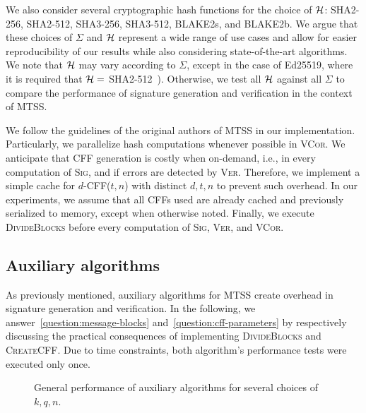 \documentclass[12pt]{article}
\begin{document}
We also consider several cryptographic hash functions for the choice of $\mathcal{H}$: SHA2-256, SHA2-512, SHA3-256, SHA3-512, BLAKE2s, and BLAKE2b. We argue that these choices of $\Sigma$ and $\mathcal{H}$ represent a wide range of use cases and allow for easier reproducibility of our results while also considering state-of-the-art algorithms. We note that $\mathcal{H}$ may vary according to $\Sigma$, except in the case of Ed25519, where it is required that $\mathcal{H} =$ SHA2-512~\cite{rfc-8032-ed25519}). Otherwise, we test all $\mathcal{H}$ against all $\Sigma$ to compare the performance of signature generation and verification in the context of MTSS.

We follow the guidelines of the original authors of MTSS in our implementation. Particularly, we parallelize hash computations whenever possible in \textsc{VCor}. We anticipate that CFF generation is costly when on-demand, i.e., in every computation of \textsc{Sig}, and if errors are detected by \textsc{Ver}. Therefore, we implement a simple cache for $d$-CFF($t, n$) with distinct $d, t, n$ to prevent such overhead. In our experiments, we assume that all CFFs used are already cached and previously serialized to memory, except when otherwise noted. Finally, we execute \textsc{DivideBlocks} before every computation of \textsc{Sig}, \textsc{Ver}, and \textsc{VCor}.

\subsection{Auxiliary algorithms}
\label{sec:auxiliary-algorithms}

As previously mentioned, auxiliary algorithms for MTSS create overhead in signature generation and verification. In the following, we answer~\ref{question:message-blocks} and~\ref{question:cff-parameters} by respectively discussing the practical consequences of implementing \textsc{DivideBlocks} and \textsc{CreateCFF}. Due to time constraints, both algorithm's performance tests were executed only once.

\begin{figure}[htbp]
    \centering
    \hfill
    \caption{General performance of auxiliary algorithms for several choices of $k, q, n$.}
\end{figure}
\end{document}
